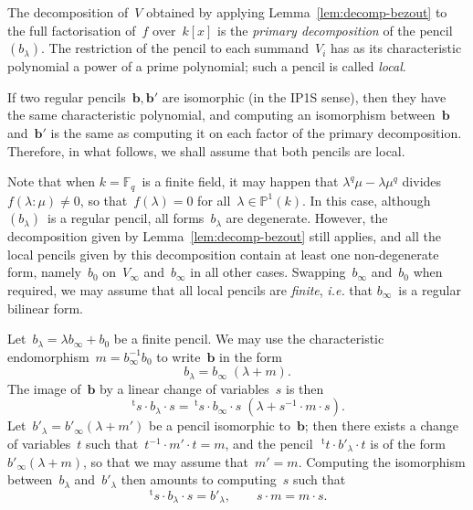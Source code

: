 \documentclass{lms}%
\def\transpose{\,{}^{\mathrm{t}\!}}
\def\F{\mathbb{F}}
\begin{document}
The decomposition of~$V$ obtained by applying
Lemma~\ref{lem:decomp-bezout} to the full factorisation of~$f$
over~$k[x]$ is the \emph{primary decomposition} of the pencil~$(b_{λ})$.
The restriction of the pencil to each summand~$V_i$ has as its
characteristic polynomial a power of a prime polynomial; such a pencil is
called \emph{local}.

If two regular pencils~$\bm{b}, \bm{b}'$ are isomorphic (in the IP1S sense), then
they have the same characteristic polynomial, and computing an
isomorphism between~$\bm{b}$ and~$\bm{b}'$ is the same as computing it on each
factor of the primary decomposition. Therefore, in what follows, we shall
assume that both pencils are local.

\medskip

Note that when $k = \F_q$~is a finite field, it may happen that $λ^q μ -
λ μ^q$ divides~$f(λ:μ) ≠ 0$, so that~$f(λ) = 0$ for all~$λ ∈ ℙ^1(k)$. In
this case, although $(b_{λ})$~is a regular pencil, all forms~$b_{λ}$ are
degenerate. However, the decomposition given by
Lemma~\ref{lem:decomp-bezout} still applies, and all the local pencils
given by this decomposition contain at least one non-degenerate form,
namely~$b_{0}$ on~$V_{∞}$ and~$b_{∞}$ in all other cases.
Swapping~$b_{∞}$ and~$b_{0}$ when required, we may assume that all local
pencils are \emph{finite}, \emph{i.e.} that $b_{∞}$~is a regular bilinear
form.

\bigskip

Let~$b_{λ} = λ b_{∞} + b_0$ be a finite pencil. We may use the
characteristic endomorphism~$m = b_{∞}^{-1}b_0$ to write~$\bm{b}$ in the form
\begin{equation}\label{eq:adjoint}
b_{λ} = b_{∞}\;(λ + m).
\end{equation}
The image of~$\bm{b}$ by a linear change of variables~$s$ is then
\begin{equation}\label{eq:adjoint-change}
\transpose{s} · b_{λ} · s = 
  \transpose{s} · b_{∞} · s\; ( λ + s^{-1} · m · s).
\end{equation}
Let~$b'_{λ} = b'_{∞} (λ + m')$ be a pencil isomorphic to~$\bm{b}$; then there
exists a change of variables~$t$ such that~$t^{-1} · m' · t = m$, and the
pencil~$\transpose{t} · b'_{λ} · t$ is of the form $b'_{∞} (λ + m)$, so
that we may assume that~$m' = m$. Computing the isomorphism
between~$b_{λ}$ and~$b'_{λ}$ then amounts to computing~$s$ such that
\begin{equation}
\transpose{s} · b_{λ} · s = b'_{λ}, \qquad s · m = m · s.
\end{equation}
\end{document}
